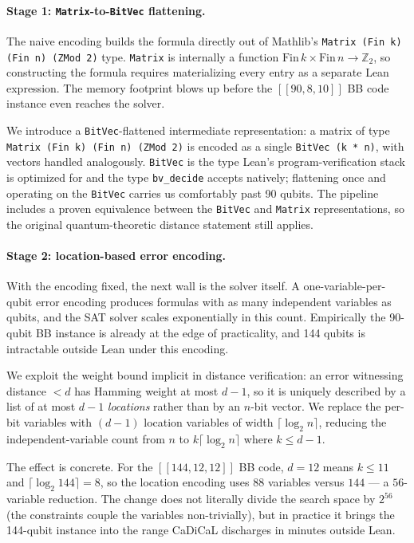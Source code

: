 \paragraph{Stage 1: \lstinline{Matrix}-to-\lstinline{BitVec} flattening.} The
naive encoding builds the formula directly out of Mathlib's \lstinline{Matrix (Fin k) (Fin n) (ZMod 2)} type. \lstinline{Matrix} is
internally a function
$\mathrm{Fin}\,k \times \mathrm{Fin}\,n \to \mathbb{Z}_2$, so constructing the
formula requires materializing every entry as a separate Lean expression. The
memory footprint blows up before the $[[90,8,10]]$ BB code instance even reaches
the solver.

We introduce a \lstinline{BitVec}-flattened intermediate representation: a
matrix of type \lstinline{Matrix (Fin k) (Fin n) (ZMod 2)} is encoded as a
single \lstinline{BitVec (k * n)}, with vectors handled analogously.
\lstinline{BitVec} is the type Lean's program-verification stack is optimized
for and the type \lstinline{bv_decide} accepts natively; flattening once and
operating on the \lstinline{BitVec} carries us comfortably past 90 qubits. The
pipeline includes a proven equivalence between the \lstinline{BitVec} and
\lstinline{Matrix} representations, so the original quantum-theoretic distance
statement still applies.

\paragraph{Stage 2: location-based error encoding.} With the encoding fixed, the
next wall is the solver itself. A one-variable-per-qubit error encoding produces
formulas with as many independent variables as qubits, and the SAT solver scales
exponentially in this count. Empirically the 90-qubit BB instance is already at
the edge of practicality, and 144 qubits is intractable outside Lean under this
encoding.

We exploit the weight bound implicit in distance verification: an error
witnessing distance $< d$ has Hamming weight at most $d-1$, so it is uniquely
described by a list of at most $d-1$ \emph{locations} rather than by an $n$-bit
vector. We replace the per-bit variables with $(d-1)$ location variables of
width $\lceil \log_2 n \rceil$, reducing the independent-variable count from $n$
to $k\lceil \log_2 n \rceil$ where $k \leq d-1$.

The effect is concrete. For the $[[144, 12, 12]]$ BB code, $d = 12$ means $k
\leq 11$ and $\lceil \log_2 144 \rceil = 8$, so the location encoding uses $88$
variables versus $144$ --- a $56$-variable reduction. The change does not
literally divide the search space by $2^{56}$ (the constraints couple the
variables non-trivially), but in practice it brings the 144-qubit instance into
the range CaDiCaL discharges in minutes outside Lean.

